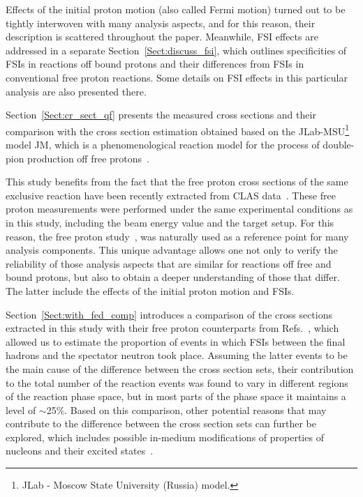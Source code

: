 \documentclass[prc,twocolumn,superscriptaddress,showpacs,amssymb,amsmath,amsfonts,aps,nofootinbib]{revtex4-1}
\begin{document}
Effects of the initial proton motion (also called Fermi motion) turned out to be tightly interwoven with many analysis aspects, and for this reason, their description is scattered throughout the paper. Meanwhile, FSI effects are addressed in a separate Section~\ref{Sect:discuss_fsi}, which outlines specificities of FSIs in reactions off bound protons and their differences from FSIs in conventional free proton reactions. Some details on FSI effects in this particular analysis are also presented there.




Section~\ref{Sect:cr_sect_qf} presents the measured cross sections and their comparison with the cross section estimation obtained based on the JLab-MSU\footnote[1]{JLab - Moscow State University (Russia) model.} model JM, which is a phenomenological reaction model for the process of double-pion production off free protons~\cite{Mokeev:2008iw,Mokeev:2012vsa,Mokeev:2015lda}.



This study benefits from the fact that the free proton cross sections of the same exclusive reaction have been recently extracted from CLAS data~\cite{Fed_an_note:2017,Fed_paper_2018}. These free proton measurements were performed under the same experimental conditions as in this study, including the beam energy value and the target setup. For this reason, the free proton study~\cite{Fed_an_note:2017,Fed_paper_2018}, was naturally used as a reference point for many analysis components. This unique advantage allows one not only to verify the reliability of those analysis aspects that are similar for reactions off free and bound protons, but also to obtain a deeper understanding of those that differ. The latter include the effects of the initial proton motion and FSIs.


Section~\ref{Sect:with_fed_comp} introduces a comparison of the cross sections extracted in this study with their free proton counterparts from Refs.\!~\cite{Fed_an_note:2017,Fed_paper_2018}, which allowed us to estimate the proportion of events in which FSIs between the final hadrons and the spectator neutron took place. Assuming the latter events to be the main cause of the difference between the cross section sets, their contribution to the total number of the reaction events was found to vary in different regions of the reaction phase space, but in most parts of the phase space it maintains a level of $\sim$25\%. Based on this comparison, other potential reasons that may contribute to the difference between the cross section sets can further be explored, which includes possible in-medium modifications of properties of nucleons and their excited states~\cite{Mokeev:1995fy,Bianchi:1994ax,Ahrens:1986hn,Krusche:2004xz,Noble:1980my}.
\end{document}
